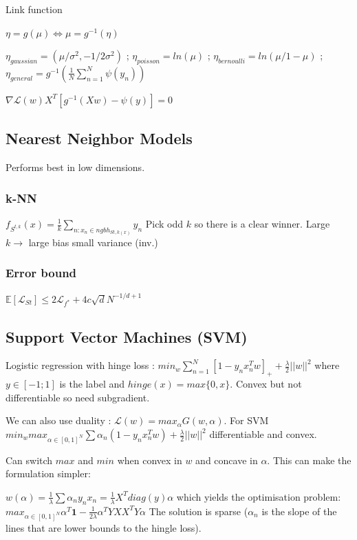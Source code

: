 Link function

$\eta = g(\mu) \Leftrightarrow \mu = g^{-1}(\eta)$

$\eta_{gaussian} = (\mu / \sigma^2, - 1 / 2 \sigma^2)$
; $\eta_{poisson} = ln(\mu)$
; $\eta_{bernoulli} = ln(\mu / 1 - \mu)$
; $\eta_{general} = g^{-1}(\frac{1}{N} \sum_{n=1}^N \psi(y_n))$

$\nabla \mathcal{L}(w) X^T [g^{-1}(Xw)- \psi(y)]= 0$

\subsection{Nearest Neighbor Models}
Performs best in low dimensions.
\subsubsection{k-NN}
$f_{S^{t,k}}(x) = \frac{1}{k} \sum_{n:x_n\in ngbh_{S{t,k}(x)}} y_n$
Pick odd $k$ so there is a clear winner.
Large $k \rightarrow$ large bias small variance (inv.)

\subsubsection{Error bound}
$\mathbb{E}[\mathcal{L}_{St}] \le 2 \mathcal{L}_{f^*} + 4 c \sqrt{d} N^{-1/d+1}$

\subsection{Support Vector Machines (SVM)}
Logistic regression with hinge loss :
$min_w \sum_{n=1}^N [1-y_n x_n^T w]_+ + \frac{\lambda}{2} ||w||^2$ where $y \in [-1;1]$ is the label and $hinge(x)= max\{0,x\}$. Convex but not differentiable so need subgradient.

We can also use duality : $\mathcal{L}(w) = max_{\alpha} G(w, \alpha)$. For SVM
$min_{w} max_{\alpha \in [0,1]^N} \sum \alpha_n (1 - y_nx_n^Tw) + \frac{\lambda}{2} ||w||^2$ differentiable and convex.

Can switch $max$ and $min$ when convex in $w$ and concave in $\alpha$. This can make the formulation simpler:

$w(\alpha) = \frac{1}{\lambda} \sum \alpha_n y_n x_n = \frac{1}{\lambda} X^T diag(y) \alpha$ which yields the optimisation problem:
$max_{\alpha \in [0,1]^N} \alpha^T\mathbf{1} - \frac{1}{2\lambda} \alpha^T Y X X^T Y \alpha$
The solution is sparse ($\alpha_n$ is the slope of the lines that are lower bounds to the hingle loss).

